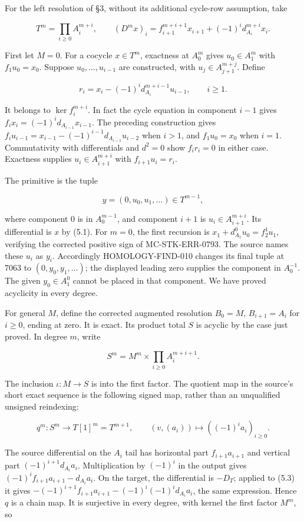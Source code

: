 For the left resolution of §3, without its additional cycle-row assumption, take

\[
T^m=\prod_{i\geq0}A_i^{m+i},\qquad
(D^mx)_i=f_{i+1}^{m+i+1}x_{i+1}+(-1)^i d_{A_i}^{m+i}x_i.       \tag{5.1}
\]

First let \(M=0\). For a cocycle \(x\in T^m\), exactness at \(A_0^m\) gives \(u_0\in A_1^m\) with \(f_1u_0=x_0\). Suppose \(u_0,\ldots,u_{i-1}\) are constructed, with \(u_j\in A_{j+1}^{m+j}\). Define

\[
r_i=x_i-(-1)^i d_{A_i}^{m+i-1}u_{i-1},\qquad i\geq1.
\]

It belongs to \(\ker f_i^{m+i}\). In fact the cycle equation in component \(i-1\) gives \(f_ix_i=(-1)^i d_{A_{i-1}}x_{i-1}\). The preceding construction gives \(f_iu_{i-1}=x_{i-1}-(-1)^{i-1}d_{A_{i-1}}u_{i-2}\) when \(i>1\), and \(f_1u_0=x_0\) when \(i=1\). Commutativity with differentials and \(d^2=0\) show \(f_ir_i=0\) in either case. Exactness supplies \(u_i\in A_{i+1}^{m+i}\) with \(f_{i+1}u_i=r_i\).

The primitive is the tuple

\[
y=(0,u_0,u_1,\ldots)\in T^{m-1},             \tag{5.2}
\]

where component 0 is in \(A_0^{m-1}\), and component \(i+1\) is \(u_i\in A_{i+1}^{m+i}\). Its differential is \(x\) by (5.1). For \(m=0\), the first recursion is \(x_1+d_{A_1}^0u_0=f_2^1u_1\), verifying the corrected positive sign of MC-STK-ERR-0793. The source names these \(u_i\) as \(y_i\). Accordingly HOMOLOGY-FIND-010 changes its final tuple at 7063 to \((0,y_0,y_1,\ldots)\); the displayed leading zero supplies the component in \(A_0^{-1}\). The given \(y_0\in A_1^0\) cannot be placed in that component. We have proved acyclicity in every degree.

For general \(M\), define the corrected augmented resolution \(B_0=M\), \(B_{i+1}=A_i\) for \(i\geq0\), ending at zero. It is exact. Its product total \(S\) is acyclic by the case just proved. In degree \(m\), write

\[
S^m=M^m\times\prod_{i\geq0}A_i^{m+i+1}.
\]

The inclusion \(\iota:M\to S\) is into the first factor. The quotient map in the source's short exact sequence is the following signed map, rather than an unqualified unsigned reindexing:

\[
q^m:S^m\longrightarrow T[1]^m=T^{m+1},\qquad
(v,(a_i))\longmapsto((-1)^ia_i)_{i\geq0}.       \tag{5.3}
\]

The source differential on the \(A_i\) tail has horizontal part \(f_{i+1}a_{i+1}\) and vertical part \((-1)^{i+1}d_{A_i}a_i\). Multiplication by \((-1)^i\) in the output gives \((-1)^if_{i+1}a_{i+1}-d_{A_i}a_i\). On the target, the differential is \(-D_T\); applied to (5.3) it gives \(-(-1)^{i+1}f_{i+1}a_{i+1}-(-1)^i(-1)^id_{A_i}a_i\), the same expression. Hence \(q\) is a chain map. It is surjective in every degree, with kernel the first factor \(M^m\), so

